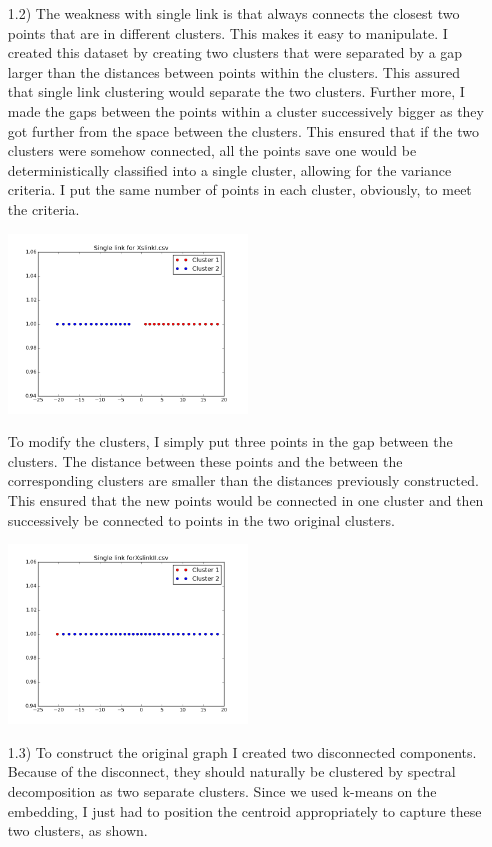 \documentclass[12pt]{article}
\begin{document}
\begin{enumerate}
\item[1.2)] The weakness with single link is that always connects the closest two points that are in different clusters. This makes it easy to manipulate. I created this dataset by creating two clusters that were separated by a gap larger than the distances between points within the clusters. This assured that single link clustering would separate the two clusters. Further more, I made the gaps between the points within a cluster successively bigger as they got further from the space between the clusters. This ensured that if the two clusters were somehow connected, all the points save one would be deterministically classified into a single cluster, allowing for the variance criteria. I put the same number of points in each cluster, obviously, to meet the criteria.

\includegraphics[width=0.5\textwidth]{Single_link_for_XslinkI.png}

To modify the clusters, I simply put three points in the gap between the clusters. The distance between these points and the between the corresponding clusters are smaller than the distances previously constructed. This ensured that the new points would be connected in one cluster and then successively be connected to points in the two original clusters.

\includegraphics[width=0.5\textwidth]{Single_link_forXslinkII.png}

\item[1.3)] To construct the original graph I created two disconnected components. Because of the disconnect, they should naturally be clustered by spectral decomposition as two separate clusters. Since we used k-means on the embedding, I just had to position the centroid appropriately to capture these two clusters, as shown. 


\end{enumerate}
\end{document}
